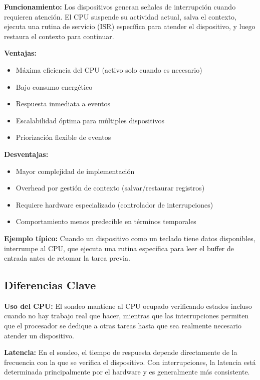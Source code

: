 \documentclass{article}
\begin{document}
\textbf{Funcionamiento:}
Los dispositivos generan señales de interrupción cuando requieren atención. El CPU suspende su actividad actual, salva el contexto, ejecuta una rutina de servicio (ISR) específica para atender el dispositivo, y luego restaura el contexto para continuar.

\textbf{Ventajas:}
\begin{itemize}[leftmargin=*]
    \item Máxima eficiencia del CPU (activo solo cuando es necesario)
    \item Bajo consumo energético
    \item Respuesta inmediata a eventos
    \item Escalabilidad óptima para múltiples dispositivos
    \item Priorización flexible de eventos
\end{itemize}

\textbf{Desventajas:}
\begin{itemize}[leftmargin=*]
    \item Mayor complejidad de implementación
    \item Overhead por gestión de contexto (salvar/restaurar registros)
    \item Requiere hardware especializado (controlador de interrupciones)
    \item Comportamiento menos predecible en términos temporales
\end{itemize}

\textbf{Ejemplo típico:}
Cuando un dispositivo como un teclado tiene datos disponibles, interrumpe al CPU, que ejecuta una rutina específica para leer el buffer de entrada antes de retomar la tarea previa.

\subsection{Diferencias Clave}

\textbf{Uso del CPU:}
El sondeo mantiene al CPU ocupado verificando estados incluso cuando no hay trabajo real que hacer, mientras que las interrupciones permiten que el procesador se dedique a otras tareas hasta que sea realmente necesario atender un dispositivo.

\textbf{Latencia:}
En el sondeo, el tiempo de respuesta depende directamente de la frecuencia con la que se verifica el dispositivo. Con interrupciones, la latencia está determinada principalmente por el hardware y es generalmente más consistente.
\end{document}
